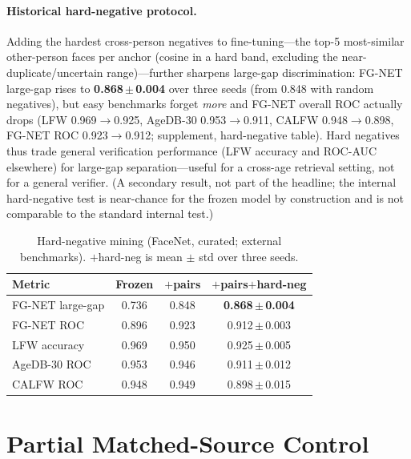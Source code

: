 \documentclass[journal]{IEEEtran}
\begin{document}
\paragraph{Historical hard-negative protocol.}
Adding the hardest cross-person negatives to fine-tuning---the top-5 most-similar other-person faces per anchor (cosine in a hard band, excluding the near-duplicate/uncertain range)---further sharpens large-gap discrimination: FG-NET large-gap rises to \textbf{0.868\,$\pm$\,0.004} over three seeds (from 0.848 with random negatives), but easy benchmarks forget \emph{more} and FG-NET overall ROC actually drops (LFW 0.969$\to$0.925, AgeDB-30 0.953$\to$0.911, CALFW 0.948$\to$0.898, FG-NET ROC 0.923$\to$0.912; supplement, hard-negative table). Hard negatives thus trade general verification performance (LFW accuracy and ROC-AUC elsewhere) for large-gap separation---useful for a cross-age retrieval setting, not for a general verifier. (A secondary result, not part of the headline; the internal hard-negative test is near-chance for the frozen model by construction and is not comparable to the standard internal test.)

\begin{table}[!t]
\caption{Hard-negative mining (FaceNet, curated; external benchmarks). $+$hard-neg is mean $\pm$ std over three seeds.}
\label{tab:supp-hardneg}
\centering
\footnotesize
\begin{tabular}{@{}lccc@{}}
\toprule
Metric & Frozen & $+$pairs & $+$pairs$+$hard-neg \\
\midrule
FG-NET large-gap & 0.736 & 0.848 & \textbf{0.868\,$\pm$\,0.004} \\
FG-NET ROC & 0.896 & 0.923 & 0.912\,$\pm$\,0.003 \\
LFW accuracy & 0.969 & 0.950 & 0.925\,$\pm$\,0.005 \\
AgeDB-30 ROC & 0.953 & 0.946 & 0.911\,$\pm$\,0.012 \\
CALFW ROC & 0.948 & 0.949 & 0.898\,$\pm$\,0.015 \\
\bottomrule
\end{tabular}
\end{table}


\section{Partial Matched-Source Control}\label{sec:matched-source}
\end{document}
